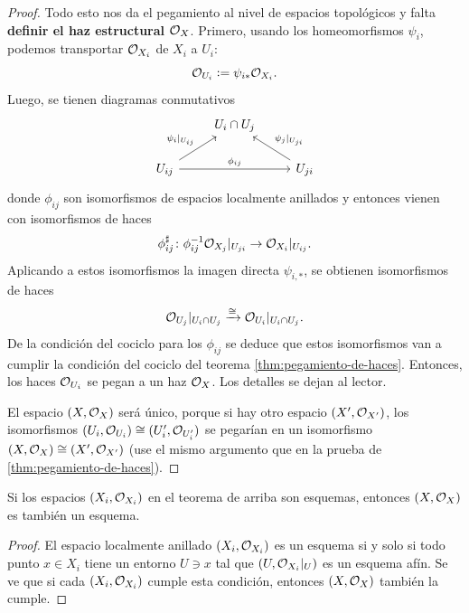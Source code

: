 \documentclass{article}
\numberwithin{equation}{section}
\theoremstyle{definition}
\begin{document}
\begin{teorema}
\begin{proof}
    \vspace{1em}

    Todo esto nos da el pegamiento al nivel de espacios topológicos y falta
    \textbf{definir el haz estructural $\mathcal{O}_X$}. Primero, usando
    los homeomorfismos $\psi_i$, podemos transportar $\mathcal{O}_{X_i}$ de $X_i$ a
    $U_i$:
    $$\mathcal{O}_{U_i} \mathrel{\mathop:}= \psi_{i*} \mathcal{O}_{X_i}.$$
    Luego, se tienen diagramas conmutativos
    \[ \begin{tikzcd}
        & U_i \cap U_j \\
        U_{ij} \ar{rr}{\phi_{ij}}\ar{ur}{\psi_i|_{U_{ij}}} && U_{ji}\ar{ul}[swap]{\psi_j|_{U_{ji}}}
      \end{tikzcd} \]
    donde $\phi_{ij}$ son isomorfismos de espacios localmente anillados
    y entonces vienen con isomorfismos de haces
    $$\phi_{ij}^\sharp\colon \phi_{ij}^{-1}\mathcal{O}_{X_j}|_{U_{ji}} \to \mathcal{O}_{X_i}|_{U_{ij}}.$$
    Aplicando a estos isomorfismos la imagen directa $\psi_{i,*}$, se obtienen
    isomorfismos de haces
    $$\mathcal{O}_{U_j}|_{U_i\cap U_j} \xrightarrow{\cong} \mathcal{O}_{U_i}|_{U_i\cap U_j}.$$
    De la condición del cociclo para los $\phi_{ij}$ se deduce que estos
    isomorfismos van a cumplir la condición del cociclo del teorema
    \ref{thm:pegamiento-de-haces}. Entonces, los haces $\mathcal{O}_{U_i}$ se pegan
    a un haz $\mathcal{O}_X$. Los detalles se dejan al lector.

    \vspace{1em}

    El espacio $(X,\mathcal{O}_X)$ será único, porque si hay otro espacio
    $(X', \mathcal{O}_{X'})$, los isomorfismos $(U_i, \mathcal{O}_{U_i}) \cong (U'_i, \mathcal{O}_{U'_i})$
    se pegarían en un isomorfismo $(X,\mathcal{O}_X) \cong (X',\mathcal{O}_{X'})$ (use el mismo
    argumento que en la prueba de \ref{thm:pegamiento-de-haces}).
  \end{proof}
\end{teorema}

\begin{proposicion}
  Si los espacios $(X_i, \mathcal{O}_{X_i})$ en el teorema de arriba son esquemas,
  entonces $(X, \mathcal{O}_X)$ es también un esquema.

  \begin{proof}
    El espacio localmente anillado $(X_i, \mathcal{O}_{X_i})$ es un esquema si y solo si
    todo punto $x \in X_i$ tiene un entorno $U \ni x$ tal que $(U, \mathcal{O}_{X_i}|_U)$
    es un esquema afín. Se ve que si cada $(X_i, \mathcal{O}_{X_i})$ cumple esta
    condición, entonces $(X, \mathcal{O}_X)$ también la cumple.
  \end{proof}
\end{proposicion}
\end{document}
